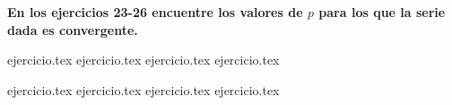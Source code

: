 \vspace{0.5cm}
\noindent\textbf{En los ejercicios 23-26 encuentre los valores de $p$ para los que la serie dada es convergente.}
\begin{enumerate}
    \setcounter{enumi}{22}
    {ejercicio.tex}
{ejercicio.tex}
{ejercicio.tex}
{ejercicio.tex}
\end{enumerate}

\vspace{0.5cm}
\begin{enumerate}
    \setcounter{enumi}{26}
    {ejercicio.tex}
{ejercicio.tex}
{ejercicio.tex}
{ejercicio.tex}
\end{enumerate}
